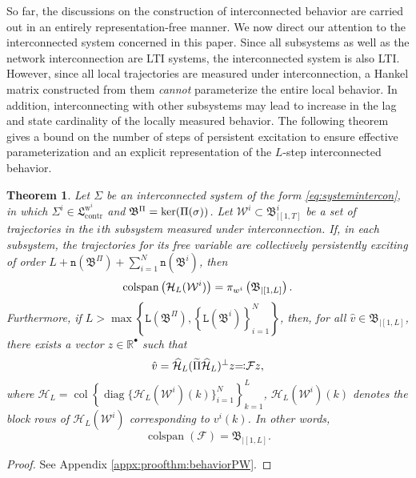 \documentclass[11pt,print,draftcls,onecolumn,romanappendices]{ieeecolor}
\newtheorem{thm}{Theorem}
\DeclareMathOperator{\col}{col}
\DeclareMathOperator{\cs}{colspan}
\DeclareMathOperator{\diag}{diag}
\newcommand{\R}{\mathbb{R}}
\newcommand{\LTI}[1]{\mathfrak{L}^{#1}}
\newcommand{\n}[1]{\mathtt{n}\left(#1\right)}
\newcommand{\lag}[1]{\mathtt{L}\left(#1\right)}
\newcommand{\proj}[2]{\pi_{#1}\left(#2\right)}
\newcommand{\revise}[1]{{\color{black} #1}}
\newcommand{\B}{\mathfrak{B}}
\newcommand{\F}{\mathcal{F}}
\newcommand{\Hk}{\mathcal{H}}
\newcommand{\bint}[1]{{|[#1]}}
\begin{document}
So far, the discussions on the construction of interconnected behavior are carried out in an entirely representation-free manner. We now direct our attention to the interconnected system concerned in this paper. Since all subsystems as well as the network interconnection are LTI systems, the interconnected system is also LTI. However, since all local trajectories are measured under interconnection, a Hankel matrix constructed from them \emph{cannot} parameterize the entire local behavior. In addition, interconnecting with other subsystems may lead to increase in the lag and state cardinality of the locally measured behavior. The following theorem gives a bound on the number of steps of persistent excitation to ensure effective parameterization and an explicit representation of the $L$-step interconnected behavior.
\begin{thm}\label{thm:behaviorPW}
	Let $\Sigma$ be an interconnected system of the form \eqref{eq:systemintercon}, in which $\Sigma^i\in\LTI{\mathrm{w}^i}_{\mathrm{contr}}$ and $\B^\Pi=\revise{\ker(\Pi(\sigma))}$. Let $\mathcal{W}^i\subset\B^i_\bint{1,T}$ be a set of trajectories in the $i$th subsystem measured under interconnection. \revise{If, in each subsystem, the trajectories for its free variable are collectively persistently exciting} of order \revise{$L+\n{\B^\Pi}+\sum_{i=1}^{N}\n{\B^i}$}, then
	\begin{equation}\label{eq:Hankelproj}
		\cs\left(\Hk_L(\revise{\mathcal{W}^i})\right)=\proj{w^i}{\B_\bint{1,L}}.
	\end{equation}
	Furthermore, if \revise{$L>\max\left\{\lag{\B^\Pi},\left\{\lag{\B^i}\right\}_{i=1}^N\right\}$}, then, for all $\hat{v}\in\B_\bint{1,L}$, there exists a vector $z\in\R^\bullet$ such that
	\begin{equation}\label{eq:Msystem}
		\hat{v}=\widehat{\Hk}_{L}(\revise{\widetilde{\Pi}}\widehat{\Hk}_{L})^\perp z\revise{\eqqcolon}\F z,
	\end{equation}
	where \revise{$\widehat{\Hk}_L=\col\left\{\diag\{\Hk_L(\mathcal{W}^i)(k)\}_{i=1}^N\right\}_{k=1}^L$, $\Hk_L(\mathcal{W}^i)(k)$ denotes the block rows of $\Hk_L(\mathcal{W}^i)$ corresponding to $v^i(k)$}. In other words, 
		\begin{equation}\label{eq:HankelPW}
		\cs(\F)=\B_\bint{1,L}.
	\end{equation}
\end{thm}
\begin{proof}
	See Appendix \ref{appx:proofthm:behaviorPW}.
\end{proof}
\end{document}
